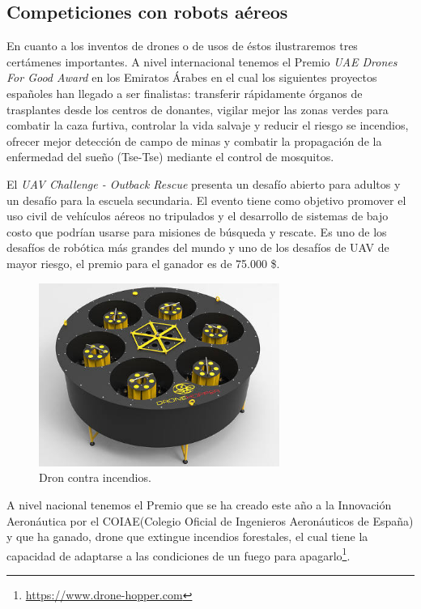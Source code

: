 \subsection{Competiciones con robots aéreos}
\hspace{1cm} En cuanto a los inventos de drones o de usos de éstos ilustraremos tres certámenes importantes. A nivel internacional tenemos el Premio \textit{UAE Drones For Good Award} en los Emiratos Árabes en el cual los siguientes proyectos españoles han llegado a ser finalistas: transferir rápidamente órganos de trasplantes desde los centros de donantes, vigilar mejor las zonas verdes para combatir la caza furtiva, controlar la vida salvaje y reducir el riesgo se incendios, ofrecer mejor detección de campo de minas y combatir la propagación de la enfermedad del sueño (Tse-Tse) mediante el control de mosquitos.

\hspace{1cm} El \textit{UAV Challenge - Outback Rescue} presenta un desafío abierto para adultos y un desafío para la escuela secundaria. El evento tiene como objetivo promover el uso civil de vehículos aéreos no tripulados y el desarrollo de sistemas de bajo costo que podrían usarse para misiones de búsqueda y rescate. Es uno de los desafíos de robótica más grandes del mundo y uno de los desafíos de UAV de mayor riesgo, el premio para el ganador es de 75.000 \$.
\\

\begin{figure}[H]
	\begin{center}
		\includegraphics[width=0.7\textwidth]{imag/IMG7.jpeg}
				\caption{Dron contra incendios.} 
	\label{fig:Dron Hopper.}	
	\end{center}
\end{figure}

\hspace{1cm} A nivel nacional tenemos el Premio que se ha creado este año a la Innovación Aeronáutica por el COIAE(Colegio Oficial de Ingenieros Aeronáuticos de España) y que ha ganado, drone que extingue incendios forestales, el cual tiene la capacidad de adaptarse a las condiciones de un fuego para apagarlo\footnote{\url{https://www.drone-hopper.com}}.


